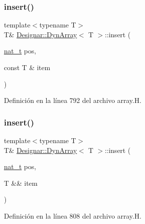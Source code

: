 \subsubsection{\texorpdfstring{insert()}{insert()}\hspace{0.1cm}{\footnotesize\ttfamily [1/4]}}
{\footnotesize\ttfamily template$<$typename T$>$ \\
T\& \hyperlink{class_designar_1_1_dyn_array}{Designar\+::\+Dyn\+Array}$<$ T $>$\+::insert (\begin{DoxyParamCaption}\item[{\hyperlink{namespace_designar_aa72662848b9f4815e7bf31a7cf3e33d1}{nat\+\_\+t}}]{pos,  }\item[{const T \&}]{item }\end{DoxyParamCaption})\hspace{0.3cm}{\ttfamily [inline]}}



Definición en la línea 792 del archivo array.\+H.

\mbox{\label{class_designar_1_1_dyn_array_a919c60d5f02488027580173832af99e9}} 
\subsubsection{\texorpdfstring{insert()}{insert()}\hspace{0.1cm}{\footnotesize\ttfamily [2/4]}}
{\footnotesize\ttfamily template$<$typename T$>$ \\
T\& \hyperlink{class_designar_1_1_dyn_array}{Designar\+::\+Dyn\+Array}$<$ T $>$\+::insert (\begin{DoxyParamCaption}\item[{\hyperlink{namespace_designar_aa72662848b9f4815e7bf31a7cf3e33d1}{nat\+\_\+t}}]{pos,  }\item[{T \&\&}]{item }\end{DoxyParamCaption})\hspace{0.3cm}{\ttfamily [inline]}}



Definición en la línea 808 del archivo array.\+H.

\mbox{\label{class_designar_1_1_dyn_array_a761d20ea5068101a95e77629145099fe}} 
